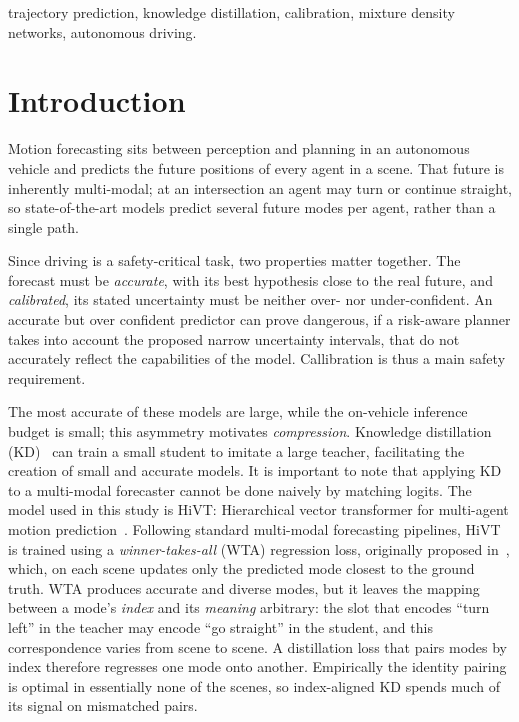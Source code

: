 \documentclass[conference]{IEEEtran}
\begin{document}
\begin{IEEEkeywords}
trajectory prediction, knowledge distillation, calibration, mixture density
networks, autonomous driving.
\end{IEEEkeywords}

\section{Introduction}
Motion forecasting sits between perception and planning in an autonomous vehicle and
predicts the future positions of every agent in a scene.  That future is inherently
multi-modal; at an intersection an agent may turn or continue straight, so state-of-the-art
models predict several future modes per agent, rather than a single path.

Since driving is a safety-critical task, two properties matter together. 
The forecast must be \emph{accurate}, with its best hypothesis close to the real future,
and \emph{calibrated}, its stated uncertainty must be neither over- nor under-confident.
An accurate but over confident predictor can prove dangerous, if a risk-aware planner 
takes into account the proposed narrow uncertainty intervals, that do not accurately reflect 
the capabilities of the model. Callibration is thus a main safety requirement.

The most accurate of these models are large, while the on-vehicle inference budget
is small; this asymmetry motivates \emph{compression}. Knowledge distillation
(KD)~\cite{hinton2015} can train a small student to imitate a
large teacher, facilitating the creation of small and accurate models. 
It is important to note that applying KD to a multi-modal forecaster cannot be done naively
by matching logits. The model used in this study is HiVT: Hierarchical
vector transformer for multi-agent motion prediction~\cite{hivt}. Following
standard multi-modal forecasting pipelines, HiVT is trained using a 
\emph{winner-takes-all} (WTA) regression loss,
originally proposed in~\cite{mtp2019}, which, on each scene updates only 
the predicted mode closest to the ground truth. WTA produces accurate and diverse modes, 
but it leaves the mapping 
between a mode's \emph{index} and its \emph{meaning} arbitrary: the slot that
encodes ``turn left'' in the teacher may encode ``go straight'' in the student, and
this correspondence varies from scene to scene. A distillation loss that pairs modes by
index therefore regresses one mode onto another. Empirically the identity
pairing is optimal in essentially none of the scenes, so index-aligned KD spends
much of its signal on mismatched pairs.
\end{document}
